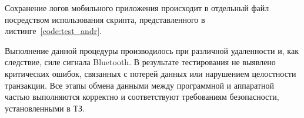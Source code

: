\begin{singlespacing}
	\small
	\captionsetup{labelsep=endash, justification=raggedright, singlelinecheck=off}
	
\end{singlespacing}

Сохранение логов мобильного приложения происходит в отдельный файл посредством использования скрипта, представленного в листинге~\ref{code:test_andr}.

\begin{singlespacing}
	\small
	\captionsetup{labelsep=endash, justification=raggedright, singlelinecheck=off}
	
\end{singlespacing}

Выполнение данной процедуры производилось при различной удаленности и, как следствие, силе сигнала Bluetooth.
В результате тестирования не выявлено критических ошибок, связанных с потерей данных или нарушением целостности транзакции.
Все этапы обмена данными между программной и аппаратной частью выполняются корректно и соответствуют требованиям безопасности, установленными в ТЗ.

